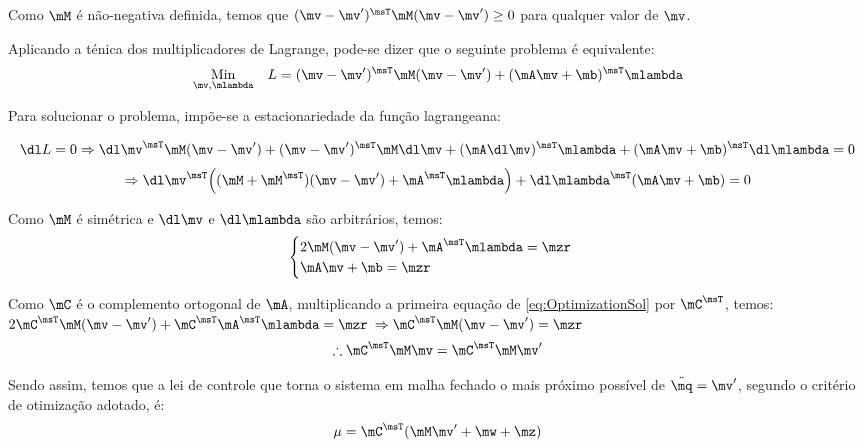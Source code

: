 Como $\mM$ \'e n\~ao-negativa definida, temos que $(\mv - \mv')^\msT \mM (\mv - \mv') \geq 0 $ para qualquer valor de $\mv$.

Aplicando a t\'enica dos multiplicadores de Lagrange, pode-se dizer que o seguinte problema \'e equivalente:
\begin{equation}
\begin{aligned}
& \underset{\mv, \mlambda}{\text{Min}}
& & L = (\mv - \mv')^\msT \mM (\mv - \mv') + (\mA \mv + \mb)^\msT \mlambda \\
\end{aligned}
\end{equation}


Para solucionar o problema, imp\~oe-se a estacionariedade da fun\c{c}\~ao lagrangeana:

$$ \dl L = 0 \Rightarrow \dl \mv^\msT \mM (\mv - \mv') + (\mv - \mv')^\msT \mM \dl \mv + (\mA \dl \mv)^\msT \mlambda + (\mA \mv + \mb)^\msT \dl \mlambda = 0 $$
$$ \Rightarrow \dl \mv^\msT \Big( (\mM + \mM^\msT)(\mv - \mv') + \mA^\msT \mlambda \Big) + \dl \mlambda^\msT (\mA \mv + \mb) = 0 $$

Como $\mM$ \'e sim\'etrica e $\dl \mv$ e $\dl \mlambda$ s\~ao arbitr\'arios, temos:
\begin{equation} \label{eq:OptimizationSol}
\begin{cases}
2 \mM (\mv - \mv') + \mA^\msT \mlambda = \mzr \\
\mA \mv + \mb = \mzr
\end{cases}
\end{equation}

Como $\mC$ \'e o complemento ortogonal de $\mA$, multiplicando a primeira equa\c{c}\~ao de \eqref{eq:OptimizationSol} por $\mC^\msT$, temos: \\

$ 2 \mC^\msT \mM (\mv - \mv') + \mC^\msT \mA^\msT \mlambda = \mzr $
$ \Rightarrow  \mC^\msT \mM (\mv - \mv')  = \mzr $
\begin{equation} \label{eq:OptimizationSol2}
\therefore \mC^\msT \mM \mv  = \mC^\msT \mM  \mv'
\end{equation}

Sendo assim, temos que a lei de controle que torna o sistema em malha fechado o mais pr\'oximo poss\'ivel de $\ddot{\mq} = \mv'$, segundo o crit\'erio de otimiza\c{c}\~ao adotado, \'e:
\begin{equation} \label{eq:ControlLawFinal}
\mu = \mC^\msT ( \mM \mv' + \mw + \mz )
\end{equation}